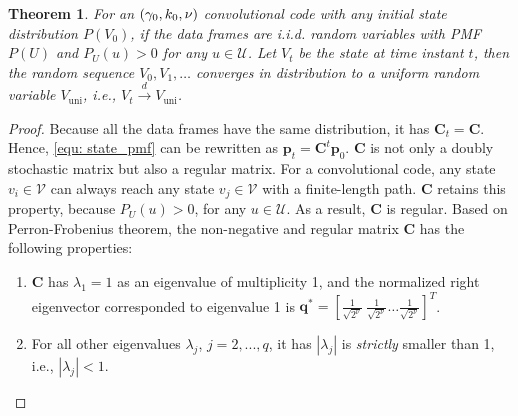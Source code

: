 \documentclass [PhD] {uclathes}
\newtheorem{theorem}{Theorem}
\begin{document}
\begin{theorem}\label{the: uinform_state}
    For an $(\gamma_0,k_0,\nu)$ convolutional code with any initial state distribution $P(V_0)$, if the data frames are i.i.d. random variables with PMF $P(U)$ and $P_U(u)>0$ for any $u\in\mathcal{U}$. Let $V_t$ be the state at time instant $t$, then the random sequence $V_0,V_1,\ldots$ converges in distribution to a uniform random variable ${V}_{\mathrm{uni}}$, i.e., $V_t\xrightarrow{d}{V}_{\mathrm{uni}}$.
\end{theorem}

\begin{proof}
    Because all the data frames have the same distribution, it has $\mathbf{C}_t=\mathbf{C}$. Hence, \eqref{equ: state_pmf} can be rewritten as
    $\mathbf{p}_{t}=\mathbf{C}^{t}\mathbf{p}_0$.
    $\mathbf{C}$ is not only a doubly stochastic matrix but also a regular matrix.
    For a convolutional code, any state $v_i \in \mathcal{V}$ can always reach any state $v_j\in\mathcal{V}$ with a finite-length path. $\mathbf{C}$ retains this property, because $P_U(u)>0$, for any $u\in\mathcal{U}$.
    As a result, $\mathbf{C}$ is regular.
    Based on Perron-Frobenius theorem\cite{gantmakher2000theory}, the non-negative and regular matrix $\mathbf{C}$ has the following properties:
    \begin{enumerate}
        \item  $\mathbf{C}$ has $\lambda_1=1$  as an eigenvalue of multiplicity 1, and the normalized right eigenvector corresponded to eigenvalue 1 is $\mathbf{q}^*=\left[\frac{1}{\sqrt{2^\nu}}~\frac{1}{\sqrt{2^\nu}}\ldots\frac{1}{\sqrt{2^\nu}}\right]^{T}$.
        \item For all other eigenvalues $\lambda_j$, $j=2,...,q$, it has $|\lambda_j|$ is \emph{strictly} smaller than 1,  i.e., $|\lambda_j|<1$.
    \end{enumerate}


\end{proof}
\end{document}
